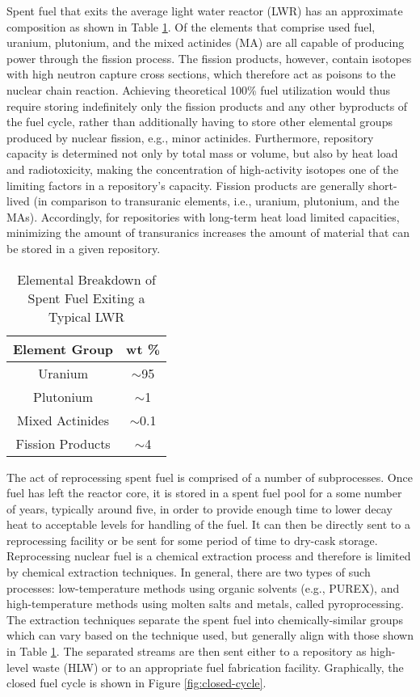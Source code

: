 Spent fuel that exits the average light water reactor (LWR) has an approximate
composition as shown in Table \ref{tab:lwr_fuel}. Of the elements that comprise
used fuel, uranium, plutonium, and the mixed actinides (MA) are all capable of
producing power through the fission process. The fission products, however,
contain isotopes with high neutron capture cross sections, which therefore act
as poisons to the nuclear chain reaction. Achieving theoretical 100\% fuel
utilization would thus require storing indefinitely only the fission products
and any other byproducts of the fuel cycle, rather than additionally having to
store other elemental groups produced by nuclear fission, e.g., minor
actinides. Furthermore, repository capacity is determined not only by total mass
or volume, but also by heat load and radiotoxicity, making the concentration of
high-activity isotopes one of the limiting factors in a repository's
capacity. Fission products are generally short-lived (in comparison to
transuranic elements, i.e., uranium, plutonium, and the MAs). Accordingly, for
repositories with long-term heat load limited capacities, minimizing the amount
of transuranics increases the amount of material that can be stored in a given
repository.

\begin{table} [h]
\centering
\begin{tabular} {|c|c|} 
\hline
Element Group & wt \% \\
\hline
Uranium           & $\sim$95  \\
Plutonium         & $\sim$1   \\
Mixed Actinides   & $\sim$0.1 \\
Fission Products  & $\sim$4   \\
\hline
\end{tabular}
\caption{Elemental Breakdown of Spent Fuel Exiting a Typical LWR}
\label{tab:lwr_fuel}
\end{table}

The act of reprocessing spent fuel is comprised of a number of
subprocesses. Once fuel has left the reactor core, it is stored in a spent fuel
pool for a some number of years, typically around five, in order to provide
enough time to lower decay heat to acceptable levels for handling of the
fuel. It can then be directly sent to a reprocessing facility or be sent for
some period of time to dry-cask storage. Reprocessing nuclear fuel is a chemical
extraction process and therefore is limited by chemical extraction
techniques. In general, there are two types of such processes: low-temperature
methods using organic solvents (e.g., PUREX), and high-temperature methods using
molten salts and metals, called pyroprocessing. The extraction techniques
separate the spent fuel into chemically-similar groups which can vary based on
the technique used, but generally align with those shown in Table
\ref{tab:lwr_fuel}. The separated streams are then sent either to a repository
as high-level waste (HLW) or to an appropriate fuel fabrication
facility. Graphically, the closed fuel cycle is shown in Figure
\ref{fig:closed-cycle}.

